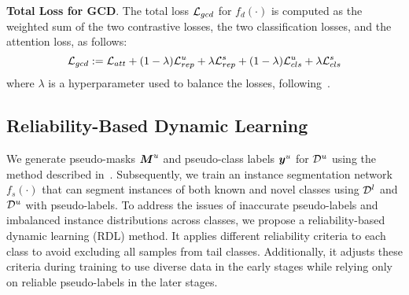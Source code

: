 \vspace{1mm}
\noindent \textbf{Total Loss for GCD}. 
The total loss $\mathcal{L}_{gcd}$ for $f_d(\cdot)$ is computed as the weighted sum of the two contrastive losses, the two classification losses, and the attention loss, as follows:
\begin{equation}
\mathcal{L}_{gcd} := \mathcal{L}_{att} + (1-\lambda) \mathcal{L}^u_{rep} + \lambda \mathcal{L}^s_{rep} + (1-\lambda) \mathcal{L}^u_{cls} + \lambda \mathcal{L}^s_{cls}
\label{eqn:gcd_loss}
\end{equation}
where $\lambda$ is a hyperparameter used to balance the losses, following~\cite{wen2023parametric}. 



% 
% 



\subsection{Reliability-Based Dynamic Learning}
\label{sec:dynamic_learning}
We generate pseudo-masks $\boldsymbol{M}^u$ and pseudo-class labels $\boldsymbol{y}^u$ for $\mathcal{D}^u$ using the method described in~. Subsequently, we train an instance segmentation network $f_s(\cdot)$ that can segment instances of both known and novel classes using $\mathcal{D}^l$ and $\mathcal{D}^u$ with pseudo-labels. To address the issues of inaccurate pseudo-labels and imbalanced instance distributions across classes, we propose a reliability-based dynamic learning (RDL) method. It applies different reliability criteria to each class to avoid excluding all samples from tail classes. Additionally, it adjusts these criteria during training to use diverse data in the early stages while relying only on reliable pseudo-labels in the later stages.


